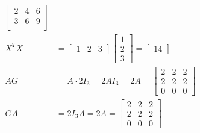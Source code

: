 \begin{align*}
\begin{bmatrix*}
		2 & 4 & 6\\
		3 & 6 & 9\\
	\end{bmatrix*}
	\\
	X^T X
	&=
	\begin{bmatrix*}
		1 & 2 & 3
	\end{bmatrix*}
	\begin{bmatrix*}
		1\\
		2\\
		3
	\end{bmatrix*}
	=
	\begin{bmatrix*}
		14
	\end{bmatrix*}
	\\
	AG &= A \cdot 2 I_3 = 2 A I_3 = 2 A =
	\begin{bmatrix*}
		2 & 2 & 2\\
		2 & 2 & 2\\
		0 & 0 & 0
	\end{bmatrix*}
	\\
	GA &= 2 I_3 A = 2 A=
	\begin{bmatrix*}
		2 & 2 & 2\\
		2 & 2 & 2\\
		0 & 0 & 0
	\end{bmatrix*}
\end{align*}


